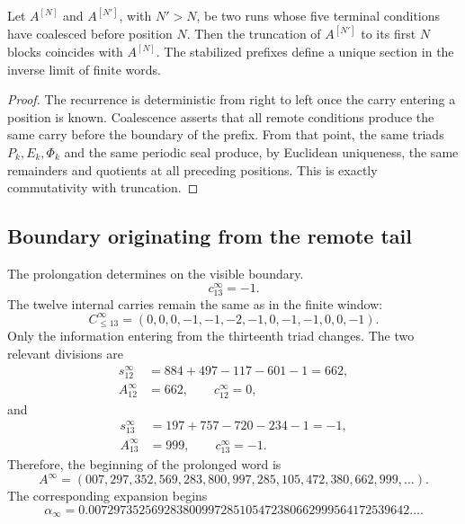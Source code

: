 \begin{theorem}
\label{p12-83-c10-s2:thm:compatibilidad-prolongacion-alpha}
Let \(A^{[N]}\) and \(A^{[N']}\), with \(N'>N\), be two runs whose
five terminal conditions have coalesced before position \(N\).
Then the truncation of \(A^{[N']}\) to its first \(N\) blocks
coincides with \(A^{[N]}\). The stabilized prefixes define a unique
section in the inverse limit of finite words.
\end{theorem}

\begin{proof}
The recurrence is deterministic from right to left once the carry entering a
position is known. Coalescence asserts that all remote
conditions produce the same carry before the boundary of the
prefix. From that point, the same triads \(P_k,E_k,\Phi_k\) and the same
periodic seal produce, by Euclidean uniqueness, the same remainders and
quotients at all preceding positions. This is exactly
commutativity with truncation.
\end{proof}

\subsection{Boundary originating from the remote tail}

The prolongation determines on the visible boundary.
\[
 c_{13}^{\infty}=-1.
\]
The twelve internal carries remain the same as in the finite window:
\[
 \boxed{
 C_{\leq13}^{\infty}
 =(0,0,0,-1,-1,-2,-1,0,-1,-1,0,0,-1).}
\]
Only the information entering from the thirteenth triad changes. The
two relevant divisions are
\[
\begin{aligned}
 s_{12}^{\infty}
 &=884+497-117-601-1=662,\\
 A_{12}^{\infty}&=662,
 \qquad c_{12}^{\infty}=0,
\end{aligned}
\]
and
\[
\begin{aligned}
 s_{13}^{\infty}
 &=197+757-720-234-1=-1,\\
 A_{13}^{\infty}&=999,
 \qquad c_{13}^{\infty}=-1.
\end{aligned}
\]
Therefore, the beginning of the prolonged word is
\[
 \boxed{
 A^{\infty}
 =(007,297,352,569,283,800,997,285,105,472,380,662,999,\ldots).}
\]
The corresponding expansion begins
\begin{equation}
 \boxed{
 \alpha_{\infty}
 =0.007297352569283800997285105472380662999564172539642\ldots.}
 \label{p12-83-c10-s2:eq:alpha-infinita-autonoma}
\end{equation}

